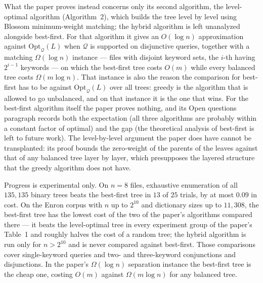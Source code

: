 \documentclass{aicr-conjecture}
\newcommand{\Qd}{\mathcal{Q}}
\newcommand{\Opt}{\mathrm{Opt}}
\begin{document}
What the paper proves instead concerns only its second algorithm, the
level-optimal algorithm (Algorithm~2), which builds the tree level by
level using Blossom minimum-weight matching; the hybrid algorithm is left
unanalyzed alongside best-first. For that algorithm it gives an
$O(\log n)$ approximation against $\Opt_{\Qd}(L)$ when $\Qd$ is supported
on disjunctive queries, together with a matching $\Omega(\log n)$
instance --- files with disjoint keyword sets, the $i$-th having
$2^{i-1}$ keywords --- on which the best-first tree costs $O(m)$ while
every balanced tree costs $\Omega(m\log n)$. That instance is also the
reason the comparison for best-first has to be against $\Opt_{\Qd}(L)$
over all trees: greedy is the algorithm that is allowed to go unbalanced,
and on that instance it is the one that wins. For the best-first
algorithm itself the paper proves nothing, and its Open questions
paragraph records both the expectation (all three algorithms are probably
within a constant factor of optimal) and the gap (the theoretical
analysis of best-first is left to future work). The level-by-level
argument the paper does have cannot be transplanted: its proof bounds the
zero-weight of the parents of the leaves against that of any balanced
tree layer by layer, which presupposes the layered structure that the
greedy algorithm does not have.

Progress is experimental only. On $n=8$ files, exhaustive enumeration of
all $135{,}135$ binary trees beats the best-first tree in $13$ of $25$
trials, by at most $0.09$ in cost. On the Enron corpus with $n$ up to
$2^{10}$ and dictionary sizes up to $11{,}308$, the best-first tree has
the lowest cost of the two of the paper's algorithms compared there ---
it beats the level-optimal tree in every experiment group of the paper's
Table~1 and roughly halves the cost of a random tree; the hybrid
algorithm is run only for $n > 2^{10}$ and is never compared against
best-first. Those comparisons cover single-keyword queries and two- and
three-keyword conjunctions and disjunctions. In the paper's
$\Omega(\log n)$ separation instance the best-first tree is the cheap
one, costing $O(m)$ against $\Omega(m \log n)$ for any balanced tree.
\end{document}
